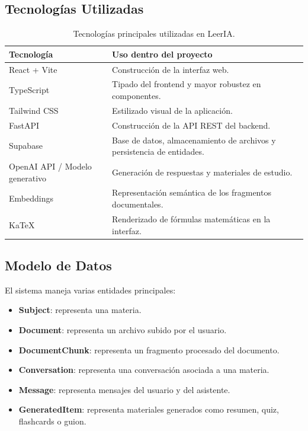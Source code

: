 \documentclass[12pt, letterpaper]{article}
\begin{document}
	\subsection{Tecnologías Utilizadas}
	
	\begin{table}[H]
		\centering
		\begin{tabular}{p{4cm} p{9cm}}
			\toprule
			\textbf{Tecnología} & \textbf{Uso dentro del proyecto} \\
			\midrule
			React + Vite & Construcción de la interfaz web. \\
			TypeScript & Tipado del frontend y mayor robustez en componentes. \\
			Tailwind CSS & Estilizado visual de la aplicación. \\
			FastAPI & Construcción de la API REST del backend. \\
			Supabase & Base de datos, almacenamiento de archivos y persistencia de entidades. \\
			OpenAI API / Modelo generativo & Generación de respuestas y materiales de estudio. \\
			Embeddings & Representación semántica de los fragmentos documentales. \\
			KaTeX & Renderizado de fórmulas matemáticas en la interfaz. \\
			\bottomrule
		\end{tabular}
		\caption{Tecnologías principales utilizadas en LeerIA.}
	\end{table}
	
	\subsection{Modelo de Datos}
	
	El sistema maneja varias entidades principales:
	
	\begin{itemize}
		\item \textbf{Subject}: representa una materia.
		\item \textbf{Document}: representa un archivo subido por el usuario.
		\item \textbf{DocumentChunk}: representa un fragmento procesado del documento.
		\item \textbf{Conversation}: representa una conversación asociada a una materia.
		\item \textbf{Message}: representa mensajes del usuario y del asistente.
		\item \textbf{GeneratedItem}: representa materiales generados como resumen, quiz, flashcards o guion.
	\end{itemize}
	
\end{document}
